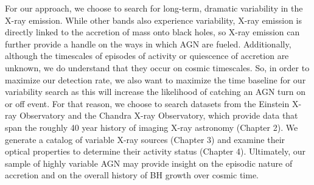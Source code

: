 For our approach, we choose to search for long-term, dramatic variability in the X-ray emission. 
While other bands also experience variability, X-ray emission is directly linked to the accretion of mass onto black holes, so X-ray emission can further provide a handle on the ways in which AGN are fueled.
Additionally, although the timescales of episodes of activity or quiescence of accretion are unknown, we do understand that they occur on cosmic timescales.
So, in order to maximize our detection rate, we also want to maximize the time baseline for our variability search as this will increase the likelihood of catching an AGN turn on or off event.
For that reason, we choose to search datasets from the Einstein X-ray Observatory and the Chandra X-ray Observatory, which provide data that span the roughly 40 year history of imaging X-ray astronomy (Chapter 2). 
We generate a catalog of variable X-ray sources (Chapter 3) and examine their optical properties to determine their activity status (Chapter 4). 
Ultimately, our sample of highly variable AGN may provide insight on the episodic nature of accretion and on the overall history of BH growth over cosmic time.


